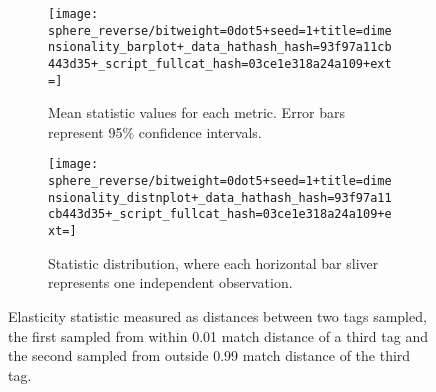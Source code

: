 \begin{figure}
\begin{center}

\begin{subfigure}[b]{\columnwidth}
\centering
\texttt{[image: sphere\_reverse/bitweight=0dot5+seed=1+title=dimensionality\_barplot+\_data\_hathash\_hash=93f97a11cb443d35+\_script\_fullcat\_hash=03ce1e318a24a109+ext=]}
\caption{
Mean statistic values for each metric.
Error bars represent 95\% confidence intervals.
}
\label{fig:sphere_reverse_distnplot}
\end{subfigure}

\vspace{2ex}

\begin{subfigure}[b]{\columnwidth}
\centering
\texttt{[image: sphere\_reverse/bitweight=0dot5+seed=1+title=dimensionality\_distnplot+\_data\_hathash\_hash=93f97a11cb443d35+\_script\_fullcat\_hash=03ce1e318a24a109+ext=]}
\caption{
Statistic distribution, where each horizontal bar sliver represents one independent observation.
}
\label{fig:sphere_reverse_barplot}
\end{subfigure}

\caption{
Elasticity statistic measured as distances between two tags sampled, the first sampled from within 0.01 match distance of a third tag and the second sampled from outside 0.99 match distance of the third tag.
}
\label{fig:sphere_reverse}

\end{center}
\end{figure}
